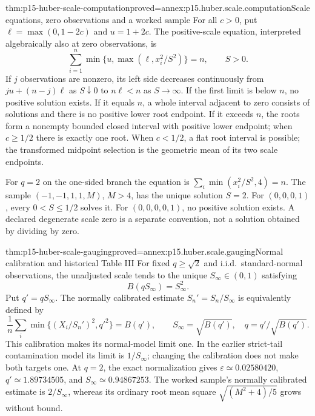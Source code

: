 \begin{hbtheorem}{thm:p15-huber-scale-computation}{proved=annex:p15.huber.scale.computation}{Scale equations, zero observations and a worked sample}
For all \(c>0\), put \(\ell=\max(0,1-2c)\) and \(u=1+2c\).
The positive-scale equation, interpreted algebraically also at
zero observations, is
\[
       \sum_{i=1}^n\min\{u,\max(\ell,x_i^2/S^2)\}=n,\qquad S>0.
\]
If \(j\) observations are nonzero, its left side decreases
continuously from \(ju+(n-j)\ell\) as \(S\downarrow0\) to \(n\ell<n\)
as \(S\to\infty\).
If the first limit is below \(n\), no positive solution exists.
If it equals \(n\), a whole interval adjacent to zero consists
of solutions and there is no positive lower root endpoint.
If it exceeds \(n\), the roots form a nonempty bounded closed
interval with positive lower endpoint; when \(c\geq1/2\) there
is exactly one root. When \(c<1/2\), a flat root interval is possible;
the transformed midpoint selection is the geometric mean of
its two scale endpoints.

For \(q=2\) on the one-sided branch the equation is
\(\sum_i\min(x_i^2/S^2,4)=n\).
The sample \((-1,-1,1,1,M)\), \(M>4\), has the unique solution
\(S=2\). For \((0,0,0,1)\), every \(0<S\leq1/2\) solves it.
For \((0,0,0,0,1)\), no positive solution exists.
A declared degenerate scale zero is a separate convention,
not a solution obtained by dividing by zero.
\end{hbtheorem}

\begin{hbtheorem}{thm:p15-huber-scale-gauging}{proved=annex:p15.huber.scale.gauging}{Normal calibration and historical Table III}
For fixed \(q\geq\sqrt2\) and i.i.d.\ standard-normal observations,
the unadjusted scale tends to the unique \(S_\infty\in(0,1)\) satisfying
\[
                  B(qS_\infty)=S_\infty^2.
\]
Put \(q'=qS_\infty\). The normally calibrated estimate
\(S_n'=S_n/S_\infty\) is equivalently defined by
\[
 \frac1n\sum_i\min\{(X_i/S_n')^2,q'^2\}=B(q'),\qquad
                  S_\infty=\sqrt{B(q')},\quad q=q'/\sqrt{B(q')}.
\]
This calibration makes its normal-model limit one. In the earlier
strict-tail contamination model its limit is \(1/S_\infty\);
changing the calibration does not make both targets one.
At \(q=2\), the exact normalization gives
\(\varepsilon\simeq0.02580420\),
\(q'\simeq1.89734505\), and \(S_\infty\simeq0.94867253\).
The worked sample's normally calibrated estimate is
\(2/S_\infty\), whereas its ordinary root mean square
\(\sqrt{(M^2+4)/5}\) grows without bound.
\end{hbtheorem}

